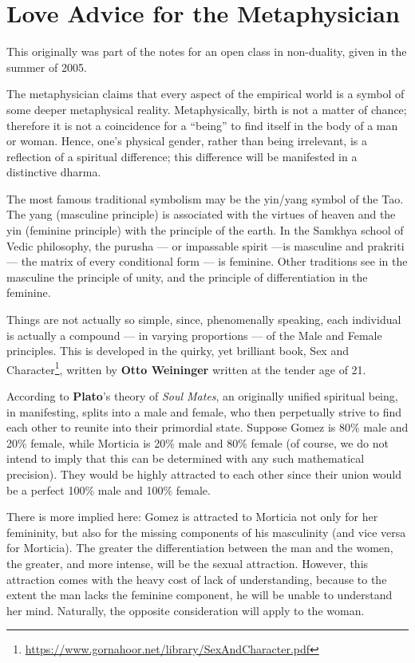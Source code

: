 \section{Love Advice for the Metaphysician}

\begin{quotex}
This originally was part of the notes for an open class in non-duality, given in the summer of 2005.
\end{quotex}

The metaphysician claims that every aspect of the empirical world is a symbol of some deeper metaphysical reality. Metaphysically, birth is not a matter of chance; therefore it is not a coincidence for a ``being'' to find itself in the body of a man or woman. Hence, one's physical gender, rather than being irrelevant, is a reflection of a spiritual difference; this difference will be manifested in a distinctive dharma.

The most famous traditional symbolism may be the yin/yang symbol of the Tao. The yang (masculine principle) is associated with the virtues of heaven and the yin (feminine principle) with the principle of the earth. In the Samkhya school of Vedic philosophy, the purusha --- or impassable spirit ---is masculine and prakriti --- the matrix of every conditional form --- is feminine. Other traditions see in the masculine the principle of unity, and the principle of differentiation in the feminine.

Things are not actually so simple, since, phenomenally speaking, each individual is actually a compound --- in varying proportions --- of the Male and Female principles. This is developed in the quirky, yet brilliant book, Sex and Character\footnote{\url{https://www.gornahoor.net/library/SexAndCharacter.pdf}}, written by \textbf{Otto Weininger} written at the tender age of 21.

According to \textbf{Plato}'s theory of \emph{Soul Mates}, an originally unified spiritual being, in manifesting, splits into a male and female, who then perpetually strive to find each other to reunite into their primordial state. Suppose Gomez is 80\% male and 20\% female, while Morticia is 20\% male and 80\% female (of course, we do not intend to imply that this can be determined with any such mathematical precision). They would be highly attracted to each other since their union would be a perfect 100\% male and 100\% female.

There is more implied here: Gomez is attracted to Morticia not only for her femininity, but also for the missing components of his masculinity (and vice versa for Morticia). The greater the differentiation between the man and the women, the greater, and more intense, will be the sexual attraction. However, this attraction comes with the heavy cost of lack of understanding, because to the extent the man lacks the feminine component, he will be unable to understand her mind. Naturally, the opposite consideration will apply to the woman.

